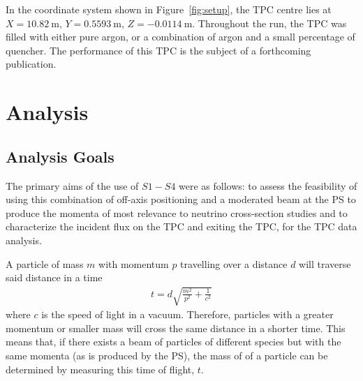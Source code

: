 In the coordinate system shown in Figure~\ref{fig:setup}, the TPC centre lies at $X=10.82~\text{m}$, $Y=0.5593~\text{m}$, $Z=-0.0114~\text{m}$. 
Throughout the run, the TPC was filled with either pure argon, or a combination of argon and a small percentage of quencher. 
The performance of this TPC is the subject of a forthcoming publication.

\section{Analysis}
\subsection{Analysis Goals}

The primary aims of the use of $\mathit{S1} - \mathit{S4}$ were as follows: to assess the feasibility of using this combination of off-axis positioning and a moderated beam at the PS to produce the momenta of most relevance to neutrino cross-section studies and to characterize the incident flux on the TPC and exiting the TPC, for the TPC data analysis. 


A particle of mass $m$ with momentum $p$ travelling over a distance $d$ will traverse said distance in a time
\begin{align}
	t = d \sqrt{\frac{m^2}{p^2} + \frac{1}{c^2}}
\end{align}
where $c$ is the speed of light in a vacuum.
Therefore, particles with a greater momentum or smaller mass will cross the same distance in a shorter time.
This means that, if there exists a beam of particles of different species but with the same momenta (as is produced by the PS), the mass of of a particle can be determined by measuring this time of flight, $t$.

